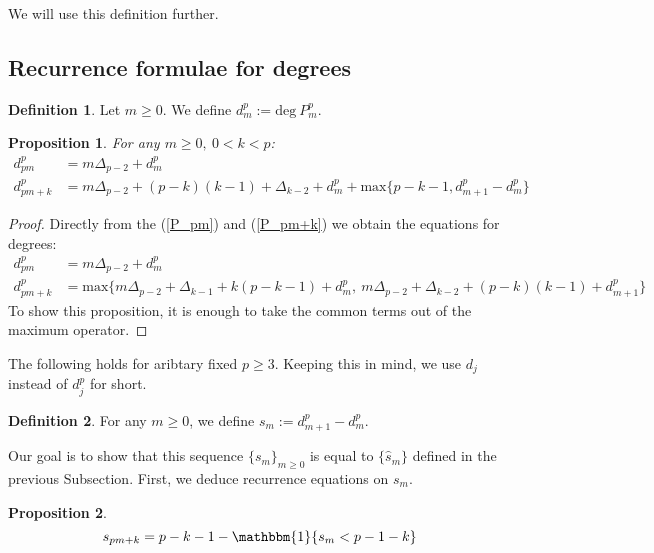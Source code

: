 \documentclass[a4paper]{article}
\theoremstyle{plain}
\newtheorem{proposition}{Proposition}[section]
\theoremstyle{definition}
\newtheorem{definition}{Definition}
\begin{document}
We will use this definition further.

\subsection{Recurrence formulae for degrees}
\begin{definition}
Let $m \ge 0$. We define $d_m^p := \mathrm{deg}\ P_m^p$.
\end{definition}
\begin{proposition} \label{dm_eq}
For any $m \ge 0,\ 0 < k < p$:
\begin{align*}
  d_{pm}^p &= m \Delta_{p-2} + d_m^p \\
  d_{pm+k}^p &= m \Delta_{p-2}+(p-k)(k-1)+\Delta_{k-2}+d_m^p + \mathrm{max}\{p-k-1, d_{m+1}^p-d_m^p\}
\end{align*}
\end{proposition}
\begin{proof}
Directly from the (\ref{P_pm}) and (\ref{P_pm+k}) we obtain the equations for degrees:
\begin{align*}
  d_{pm}^p &= m \Delta_{p-2} + d_m^p \\
  d_{pm+k}^p &= \mathrm{max}\{ m\Delta_{p-2} + \Delta_{k-1} + k(p-k-1) + d_m^p,\     
                                m\Delta_{p-2} + \Delta_{k-2} + (p-k)(k-1) + d_{m+1}^p \}
\end{align*}
To show this proposition, it is enough to take the common terms out of the maximum operator.
\end{proof}
The following holds for aribtary fixed $p \ge 3$. Keeping this in mind, we use $d_j$ instead of $d_j^p$ for short.
\begin{definition} \label{sm_def}
For any $m \ge 0$, we define $s_m := d_{m+1}^p - d_m^p $.
\end{definition}
Our goal is to show that this sequence $\{s_m\}_{m \ge 0}$ is equal to $\{\hat{s}_m\}$ defined in the previous Subsection. First, we deduce recurrence equations on $s_m$.
\begin{proposition}
\begin{equation} \label{sm_eq}
s_{pm+k} = p-k-1 - \mathbbm{1}\{s_m < p-1-k\}
\end{equation}
\end{proposition}
\end{document}

